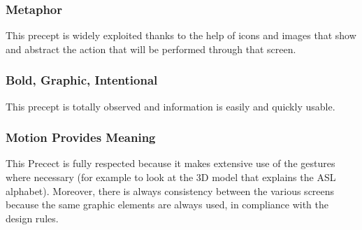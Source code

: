 \subsubsection{Metaphor}
This precept is widely exploited thanks to the help of icons and images that show and abstract the action that will be performed through that screen.

\subsubsection{Bold, Graphic, Intentional}
This precept is totally observed and information is easily and quickly usable.

\subsubsection{Motion Provides Meaning}
This Precect is fully respected because it makes extensive use of the gestures where necessary (for example to look at the 3D model that explains the ASL alphabet). Moreover, there is always consistency between the various screens because the same graphic elements are always used, in compliance with the design rules.
